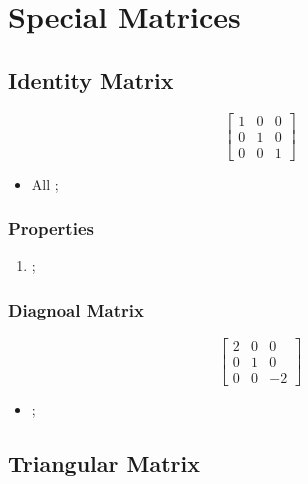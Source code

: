 \section{Special Matrices}

  \subsection{Identity Matrix}
  
    \begin{equation}
      \begin{bmatrix}
        1 & 0 & 0 \\
        0 & 1 & 0 \\ 
        0 & 0 & 1
      \end{bmatrix}
    \end{equation}
    
    \begin{itemize}
      \item All ;
    \end{itemize}
    
    \subsubsection{Properties}
    
      \begin{enumerate}
        \item {};
      \end{enumerate}
      
  \subsubsection{Diagnoal Matrix}
  
    \begin{equation}
      \begin{bmatrix}
        2 & 0 & 0 \\
        0 & 1 & 0 \\
        0 & 0 & -2
      \end{bmatrix}
    \end{equation}
    
    \begin{itemize}
      \item {};
    \end{itemize}
    
  \subsection{Triangular Matrix}
  
